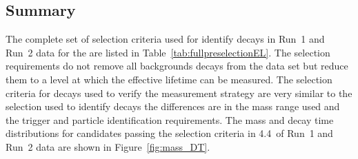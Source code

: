 \subsection{Summary}
\label{sec:ELsummary}
The complete set of selection criteria used for identify \bsmumu decays in Run~1 and Run~2 data for the \elm are listed in Table~\ref{tab:fullpreselectionEL}. %
The selection requirements do not remove all backgrounds decays from the data set but reduce them to a level at which the effective lifetime can be measured. The selection criteria for \bhh decays used to verify the measurement strategy are very similar to the selection used to identify \bmumu decays the differences are in the mass range used and the trigger and particle identification requirements. The mass and decay time distributions for \bsmumu candidates passing the selection criteria in 4.4~\fb of Run~1 and Run~2 data are shown in Figure~\ref{fig:mass_DT}. 

